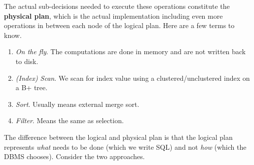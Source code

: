\documentclass{article}
\begin{document}
      \begin{definition}
        The actual sub-decisions needed to execute these operations constitute the \textbf{physical plan}, which is the actual implementation including even more operations in between each node of the logical plan. Here are a few terms to know. 
        \begin{enumerate}
          \item \textit{On the fly}. The computations are done in memory and are not written back to disk. 
          \item \textit{(Index) Scan}. We scan for index value using a clustered/unclustered index on a B+ tree. 
          \item \textit{Sort}. Usually means external merge sort. 
          \item \textit{Filter}. Means the same as selection. 
        \end{enumerate}
      \end{definition}

      The difference between the logical and physical plan is that the logical plan represents \textit{what} needs to be done (which we write SQL) and not \textit{how} (which the DBMS chooses). Consider the two approaches. 
\end{document}

